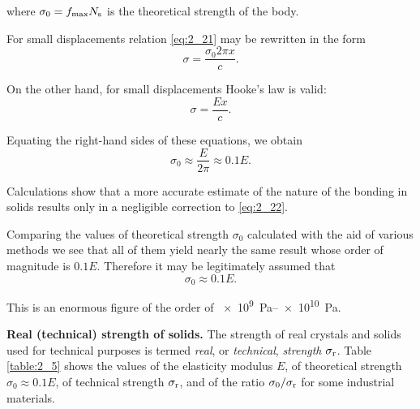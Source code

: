 \noindent
where $\sigma_0=f_{\text{max}}N_{\text{s}}$ is the theoretical strength of the body.

For small displacements relation \eqref{eq:2_21} may be rewritten in the form
\begin{equation*}
	\sigma = \frac{\sigma_0 2\pi x}{c}.
\end{equation*}

\noindent
On the other hand, for small displacements Hooke's law is valid:
\begin{equation*}
	\sigma = \frac{E x}{c}.
\end{equation*}

Equating the right-hand sides of these equations, we obtain
\begin{equation}\label{eq:2_22}
	\sigma_0 \approx \frac{E}{2\pi} \approx 0.1 E.
\end{equation}

Calculations show that a more accurate estimate of the nature of the bonding in solids results only in a negligible correction to \eqref{eq:2_22}.

Comparing the values of theoretical strength $\sigma_0$ calculated with the aid of various methods we see that all of them yield nearly the same result whose order of magnitude is $0.1E$. Therefore it may be legitimately assumed that
\begin{equation}\label{eq:2_23}
	\sigma_0 \approx 0.1 E.
\end{equation}

\noindent
This is an enormous figure of the order of \SIrange{e9}{e10}{\pascal}.

\textbf{Real (technical) strength of solids.} The strength of real crystals and solids used for technical purposes is termed \textit{real}, or \textit{technical}, \textit{strength} $\sigma_{\text{r}}$. Table \ref{table:2_5} shows the values of the elasticity modulus $E$, of theoretical strength $\sigma_0\approx 0.1E$, of technical strength $\sigma_{\text{r}}$, and of the ratio $\sigma_0/\sigma_{\text{r}}$ for some industrial materials.

